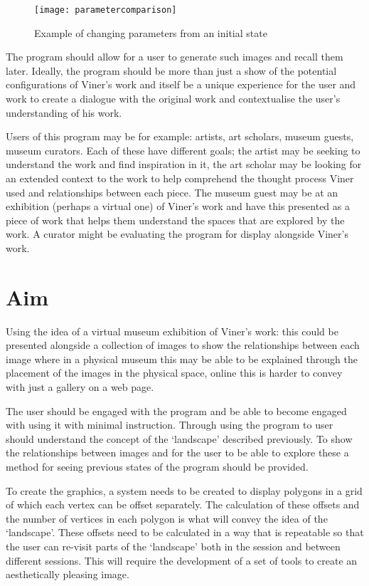 \begin{figure}[H]
    \texttt{[image: parametercomparison]}
    \caption{Example of changing parameters from an initial state}
\end{figure}

The program should allow for a user to generate such images and recall them
later. Ideally, the program should be more than just a show of the potential
configurations of Viner's work and itself be a unique experience for the user
and work to create a dialogue with the original work and contextualise the
user's understanding of his work.

Users of this program may be for example: artists, art scholars, museum guests,
museum curators. Each of these have different goals; the artist may be seeking
to understand the work and find inspiration in it, the art scholar may be
looking for an extended context to the work to help comprehend the thought
process Viner used and relationships between each piece. The museum guest may be
at an exhibition (perhaps a virtual one) of Viner's work and have this presented
as a piece of work that helps them understand the spaces that are explored by
the work. A curator might be evaluating the program for display alongside
Viner's work.

\section{Aim}
Using the idea of a virtual museum exhibition of Viner's work: this could be
presented alongside a collection of images to show the relationships between
each image where in a physical museum this may be able to be explained through
the placement of the images in the physical space, online this is harder to
convey with just a gallery on a web page.

The user should be engaged with the program and be able to become engaged with
using it with minimal instruction. Through using the program to user should
understand the concept of the `landscape' described previously. To show the
relationships between images and for the user to be able to explore these a
method for seeing previous states of the program should be provided.

To create the graphics, a system needs to be created to display polygons in a
grid of which each vertex can be offset separately. The calculation of these
offsets and the number of vertices in each polygon is what will convey the idea
of the `landscape'. These offsets need to be calculated in a way that is
repeatable so that the user can re-visit parts of the `landscape' both in the
session and between different sessions. This will require the development of a
set of tools to create an aesthetically pleasing image.

